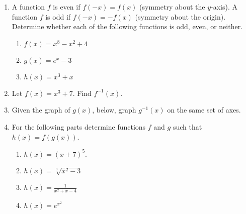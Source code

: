 \documentclass[11pt]{article}
\begin{document}
\begin{enumerate}
  \newpage

\item A function $f$ is even if $f(-x) = f(x)$ (symmetry about the
  $y$-axis). A function $f$ is odd if $f(-x) = -f(x)$ (symmetry about
  the origin).  Determine whether each of the following functions is
  odd, even, or neither.
  \begin{enumerate}
  \item $f(x) = x^8 - x^2 +4$
    \vfill
  \item $g(x) = e^x -3$
    \vfill
  \item $h(x) = x^3 + x$
    \vfill
  \end{enumerate}

\item Let $f(x) = x^3 + 7$.  Find $f^{-1}(x)$.

  \vfill\vfill\vfill

  \newpage
  
\item Given the graph of $g(x)$, below, graph $g^{-1}(x)$ on the same
  set of axes.
  \begin{center}
  \end{center}

\item For the following parts determine functions $f$ and $g$ such
  that $h(x)=f(g(x))$.
  \begin{multicols*}{2}
    \begin{enumerate}
    \item $h(x) = (x+7)^5$.
      \vfill
    \item $h(x) = \sqrt[3]{x^2-3}$
      \vfill
      \columnbreak
    \item $h(x) = \frac{1}{x^2+x-4}$
      \vfill
    \item $h(x) = e^{x^2}$
    \end{enumerate}
  \end{multicols*}

\end{enumerate}
\end{document}
